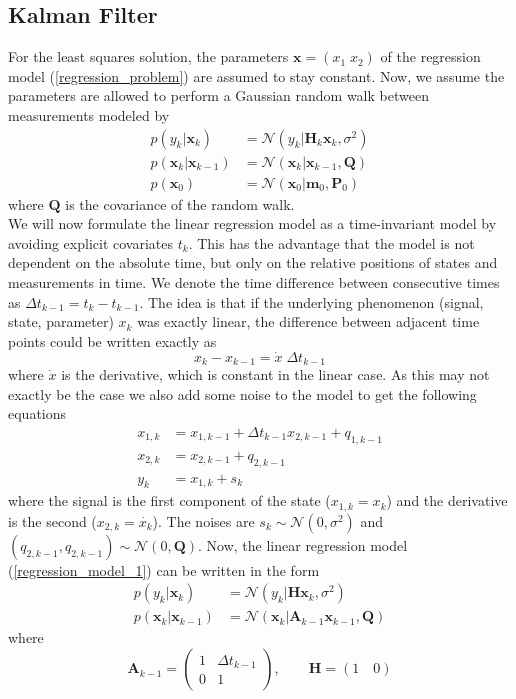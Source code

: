 \subsection{Kalman Filter} \label{KF}
For the least squares solution, the parameters
$\mathbf{x} = (x_{1} \; x_{2})$ of
the regression model (\ref{regression_problem}) are assumed to stay constant.
Now, we assume the parameters are allowed to perform
a Gaussian random walk between measurements modeled by
\begin{align*}
  p(y_k | \mathbf{x}_k) &= \mathcal{N}(y_k | \mathbf{H}_k \mathbf{x}_k, \sigma^2) \\
  p(\mathbf{x}_k | \mathbf{x}_{k-1}) &= \mathcal{N}(\mathbf{x}_k |
                               \mathbf{x}_{k-1}, \mathbf{Q}) \\
  p(\mathbf{x}_0) &= \mathcal{N}(\mathbf{x}_0 | \mathbf{m}_0, \mathbf{P}_0)
\end{align*}
where $\mathbf{Q}$ is the covariance of the random walk. \\
We will now formulate the
linear regression model as a time-invariant model
by avoiding explicit covariates $t_k$.
This has the advantage that the model is not dependent on
the absolute time, but only on the relative positions of states
and measurements in time.
We denote the time difference between consecutive times as
$\Delta t_{k-1} = t_k - t_{k-1}$. The idea is that if
the underlying phenomenon (signal, state, parameter) $x_k$ was
exactly linear, the difference between adjacent time points could be
written exactly as
$$ x_k - x_{k-1} = \dot{x} \; \Delta t_{k-1} $$
where $\dot{x}$ is the derivative, which is constant in the linear case.
As this may not exactly be the case we also add some noise to the model
to get the following equations
\begin{align*}
  x_{1,k} &= x_{1,k-1} + \Delta t_{k-1} x_{2,k-1} + q_{1,k-1} \\
  x_{2,k} &= x_{2,k-1} + q_{2,k-1} \\
  y_k &= x_{1,k} + s_k
\end{align*}
where the signal is the first component of the state
($x_{1,k} = x_k$) and the derivative is the second
($x_{2,k} = \dot{x_k}$).
The noises are $s_k \sim \mathcal{N}(0, \sigma^2)$ and
$(q_{2,k-1}, q_{2,k-1}) \sim \mathcal{N}(0,\mathbf{Q})$.
Now, the linear regression model (\ref{regression_model_1}) can be written
in the form
\begin{align*}
  p(y_k | \mathbf{x}_k) &= \mathcal{N}(y_k | \mathbf{H}
                          \mathbf{x}_k, \sigma^2) \\
  p(\mathbf{x}_k | \mathbf{x}_{k-1}) &= \mathcal{N}(\mathbf{x}_k |
                                       \mathbf{A}_{k-1} \mathbf{x}_{k-1},
                                       \mathbf{Q})
\end{align*}
where
$$
\mathbf{A}_{k-1} =
\begin{pmatrix}
  1 & \Delta t_{k-1} \\
  0 & 1
\end{pmatrix}, \quad \quad \mathbf{H} = (1 \quad 0)
$$

